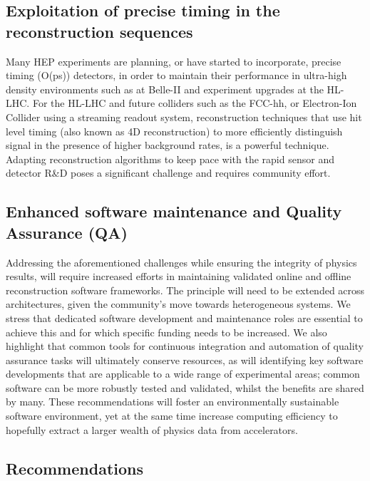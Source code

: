 \subsection{Exploitation of precise timing in the reconstruction
sequences}\label{exploitation-of-precise-timing-in-the-reconstruction-sequences}

Many HEP experiments are planning, or have started to incorporate,
precise timing (O(ps)) detectors, in order to maintain their performance
in ultra-high density environments such as at Belle-II and experiment
upgrades at the HL-LHC. For the HL-LHC and future colliders such as the
FCC-hh, or Electron-Ion Collider using a streaming readout system,
reconstruction techniques that use hit level timing (also known as 4D
reconstruction) to more efficiently distinguish signal in the presence
of higher background rates, is a powerful technique. Adapting
reconstruction algorithms to keep pace with the rapid sensor and
detector R\&D poses a significant challenge and requires community
effort.

\subsection{Enhanced software maintenance and Quality Assurance
(QA)}\label{enhanced-software-maintenance-and-quality-assurance-qa}

Addressing the aforementioned challenges while ensuring the integrity of
physics results, will require increased efforts in maintaining validated
online and offline reconstruction software frameworks. The principle
will need to be extended across architectures, given the community's
move towards heterogeneous systems. We stress that dedicated software
development and maintenance roles are essential to achieve this and for
which specific funding needs to be increased. We also highlight that
common tools for continuous integration and automation of quality
assurance tasks will ultimately conserve resources, as will identifying
key software developments that are applicable to a wide range of
experimental areas; common software can be more robustly tested and
validated, whilst the benefits are shared by many. These recommendations
will foster an environmentally sustainable software environment, yet at
the same time increase computing efficiency to hopefully extract a
larger wealth of physics data from accelerators.

\subsection{Recommendations}\label{recommendations-2}

